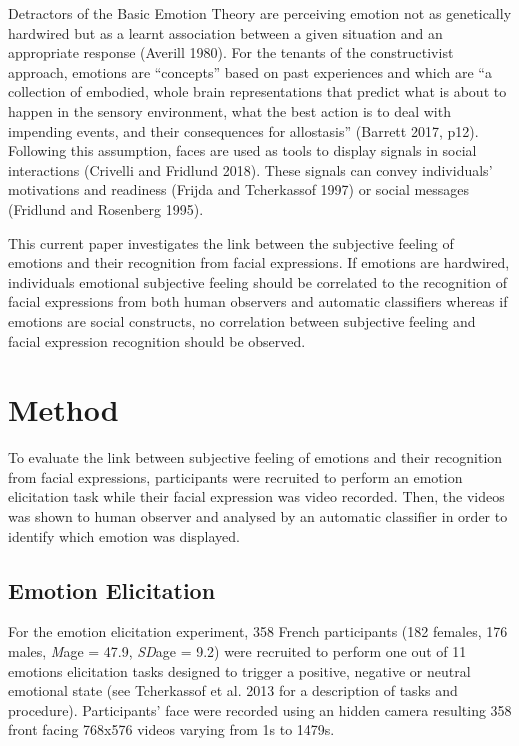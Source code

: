 \documentclass[conference,final,]{IEEEtran}
\begin{document}
Detractors of the Basic Emotion Theory are perceiving emotion not as
genetically hardwired but as a learnt association between a given
situation and an appropriate response (Averill 1980). For the tenants of
the constructivist approach, emotions are ``concepts'' based on past
experiences and which are ``a collection of embodied, whole brain
representations that predict what is about to happen in the sensory
environment, what the best action is to deal with impending events, and
their consequences for allostasis'' (Barrett 2017, p12). Following this
assumption, faces are used as tools to display signals in social
interactions (Crivelli and Fridlund 2018). These signals can convey
individuals' motivations and readiness (Frijda and Tcherkassof 1997) or
social messages (Fridlund and Rosenberg 1995).

This current paper investigates the link between the subjective feeling
of emotions and their recognition from facial expressions. If emotions
are hardwired, individuals emotional subjective feeling should be
correlated to the recognition of facial expressions from both human
observers and automatic classifiers whereas if emotions are social
constructs, no correlation between subjective feeling and facial
expression recognition should be observed.

\hypertarget{method}{%
\section{Method}\label{method}}

To evaluate the link between subjective feeling of emotions and their
recognition from facial expressions, participants were recruited to
perform an emotion elicitation task while their facial expression was
video recorded. Then, the videos was shown to human observer and
analysed by an automatic classifier in order to identify which emotion
was displayed.

\hypertarget{emotion-elicitation}{%
\subsection{Emotion Elicitation}\label{emotion-elicitation}}

For the emotion elicitation experiment, 358 French participants (182
females, 176 males, \emph{M}age = 47.9, \emph{SD}age = 9.2) were
recruited to perform one out of 11 emotions elicitation tasks designed
to trigger a positive, negative or neutral emotional state (see
Tcherkassof et al. 2013 for a description of tasks and procedure).
Participants' face were recorded using an hidden camera resulting 358
front facing 768x576 videos varying from 1s to 1479s.
\end{document}
